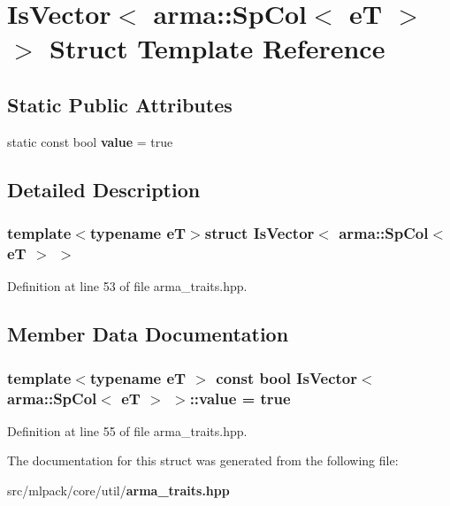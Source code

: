 \section{Is\-Vector$<$ arma\-:\-:Sp\-Col$<$ e\-T $>$ $>$ Struct Template Reference}
\label{structIsVector_3_01arma_1_1SpCol_3_01eT_01_4_01_4}
\subsection*{Static Public Attributes}
\begin{DoxyCompactItemize}
\item 
static const bool {\bf value} = true
\end{DoxyCompactItemize}


\subsection{Detailed Description}
\subsubsection*{template$<$typename e\-T$>$struct Is\-Vector$<$ arma\-::\-Sp\-Col$<$ e\-T $>$ $>$}



Definition at line 53 of file arma\-\_\-traits.\-hpp.



\subsection{Member Data Documentation}
\subsubsection[{value}]{\setlength{\rightskip}{0pt plus 5cm}template$<$typename e\-T $>$ const bool {\bf Is\-Vector}$<$ arma\-::\-Sp\-Col$<$ e\-T $>$ $>$\-::value = true\hspace{0.3cm}{\ttfamily [static]}}\label{structIsVector_3_01arma_1_1SpCol_3_01eT_01_4_01_4_a611edc88eef6969629ac2e0991bc32c9}


Definition at line 55 of file arma\-\_\-traits.\-hpp.



The documentation for this struct was generated from the following file\-:\begin{DoxyCompactItemize}
\item 
src/mlpack/core/util/{\bf arma\-\_\-traits.\-hpp}\end{DoxyCompactItemize}
